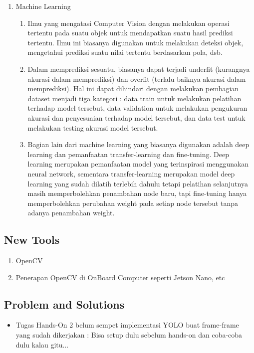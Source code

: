 \documentclass{article}
\begin{document}
\begin{enumerate}
    \item Machine Learning
    \begin{enumerate}
        \item Ilmu yang mengatasi Computer Vision dengan melakukan operasi tertentu pada suatu objek untuk mendapatkan suatu hasil prediksi tertentu. Ilmu ini biasanya digunakan untuk melakukan deteksi objek, mengetahui prediksi suatu nilai tertentu berdasarkan pola, dsb. 
        \item Dalam memprediksi sesuatu, biasanya dapat terjadi underfit (kurangnya akurasi dalam memprediksi) dan overfit (terlalu baiknya akurasi dalam memprediksi). Hal ini dapat dihindari dengan melakukan pembagian dataset menjadi tiga kategori : data train untuk melakukan pelatihan terhadap model tersebut, data validation untuk melakukan pengukuran akurasi dan penyesuaian terhadap model tersebut, dan data test untuk melakukan testing akurasi model tersebut.
        \item Bagian lain dari machine learning yang biasanya digunakan adalah deep learning dan pemanfaatan transfer-learning dan fine-tuning. Deep learning merupakan pemanfaatan model yang terinspirasi menggunakan neural network, sementara transfer-learning merupakan model deep learning yang sudah dilatih terlebih dahulu tetapi pelatihan selanjutnya masih memperbolehkan penambahan node baru, tapi fine-tuning hanya memperbolehkan perubahan weight pada setiap node tersebut tanpa adanya penambahan weight.
    \end{enumerate}
\end{enumerate}

\subsection{New Tools}
\begin{enumerate}
    \item OpenCV
    \item Penerapan OpenCV di OnBoard Computer seperti Jetson Nano, etc
\end{enumerate}

\subsection{Problem and Solutions}
\begin{itemize}
    \item Tugas Hands-On 2 belum sempet implementasi YOLO buat frame-frame yang sudah dikerjakan : Bisa setup dulu sebelum hands-on dan coba-coba dulu kalau gitu... 
\end{itemize}
\end{document}
